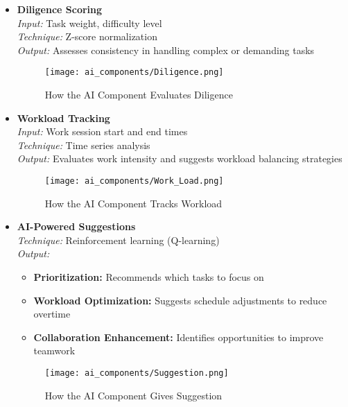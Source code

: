 \begin{itemize}
    \item \textbf{Diligence Scoring}  
    \\ \textit{Input:} Task weight, difficulty level  
    \\ \textit{Technique:} Z-score normalization  
    \\ \textit{Output:} Assesses consistency in handling complex or demanding tasks 
    \begin{figure}[H]
        \centering
        \texttt{[image: ai\_components/Diligence.png]}
        \caption{How the AI Component Evaluates Diligence}
    \end{figure} 

    \item \textbf{Workload Tracking}  
    \\ \textit{Input:} Work session start and end times  
    \\ \textit{Technique:} Time series analysis  
    \\ \textit{Output:} Evaluates work intensity and suggests workload balancing strategies  
    \begin{figure}[H]
        \centering
        \texttt{[image: ai\_components/Work\_Load.png]}
        \caption{How the AI Component Tracks Workload}
    \end{figure}

    \item \textbf{AI-Powered Suggestions} 
    \\ \textit{Technique:} Reinforcement learning (Q-learning)  
    \\ \textit{Output:}  
    \begin{itemize}
        \item \textbf{Prioritization:} Recommends which tasks to focus on  
        \item \textbf{Workload Optimization:} Suggests schedule adjustments to reduce overtime  
        \item \textbf{Collaboration Enhancement:} Identifies opportunities to improve teamwork  
    \end{itemize}
    \begin{figure}[H]
        \centering
        \texttt{[image: ai\_components/Suggestion.png]}
        \caption{How the AI Component Gives Suggestion}
    \end{figure} 


\end{itemize}
